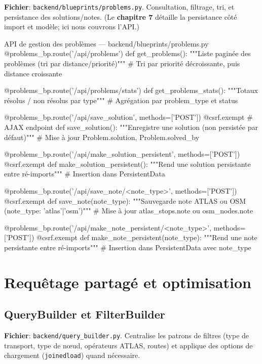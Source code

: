 \textbf{Fichier}: \texttt{backend/blueprints/problems.py}. Consultation, filtrage, tri, et persistance des solutions/notes. (Le \textbf{chapitre 7} détaille la persistance côté import et modèle; ici nous couvrons l'API.)

\begin{codebox}[language=Python]{API de gestion des problèmes — backend/blueprints/problems.py}
@problems_bp.route('/api/problems')
def get_problems():
    """Liste paginée des problèmes (tri par distance/priorité)"""
    # Tri par priorité décroissante, puis distance croissante

@problems_bp.route('/api/problems/stats')
def get_problems_stats():
    """Totaux résolus / non résolus par type"""
    # Agrégation par problem_type et status

@problems_bp.route('/api/save_solution', methods=['POST'])
@csrf.exempt  # AJAX endpoint
def save_solution():
    """Enregistre une solution (non persistée par défaut)"""
    # Mise à jour Problem.solution, Problem.solved_by

@problems_bp.route('/api/make_solution_persistent', methods=['POST'])
@csrf.exempt
def make_solution_persistent():
    """Rend une solution persistante entre ré-imports"""
    # Insertion dans PersistentData

@problems_bp.route('/api/save_note/<note_type>', methods=['POST'])
@csrf.exempt
def save_note(note_type):
    """Sauvegarde note ATLAS ou OSM (note_type: 'atlas'|'osm')"""
    # Mise à jour atlas_stops.note ou osm_nodes.note

@problems_bp.route('/api/make_note_persistent/<note_type>', methods=['POST'])
@csrf.exempt
def make_note_persistent(note_type):
    """Rend une note persistante entre ré-imports"""
    # Insertion dans PersistentData avec note_type
\end{codebox}

\section{Requêtage partagé et optimisation}

\subsection*{QueryBuilder et FilterBuilder}

\textbf{Fichier}: \texttt{backend/query\_builder.py}. Centralise les patrons de filtres (type de transport, type de nœud, opérateurs ATLAS, routes) et applique des options de chargement (\texttt{joinedload}) quand nécessaire.

